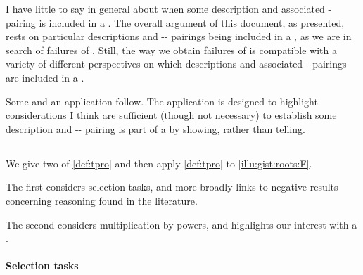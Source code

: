 \begin{note}
  I have little to say in general about when some description and associated - pairing is included in a \tpro{}.
  The overall argument of this document, as presented, rests on particular descriptions and -- pairings being included in a \tpro{}, as we are in search of failures of \issueInclusion{}.
  Still, the way we obtain failures of \issueInclusion{} is compatible with a variety of different perspectives on which descriptions and associated - pairings are included in a \tpro{}.

  Some  and an application follow.
  The application is designed to highlight considerations I think are sufficient (though not necessary) to establish some description and -- pairing is part of a \tpro{} by showing, rather than telling.
\end{note}



\subsection{}
\label{sec:illu3-1}

\begin{note}
  We give two  of \autoref{def:tpro} and then apply \autoref{def:tpro} to \autoref{illu:gist:roots:F}.

  The first  considers selection tasks, and more broadly links  to negative results concerning reasoning found in the literature.

  The second  considers multiplication by powers, and highlights our interest with a \tprof{}.
\end{note}



\paragraph*{Selection tasks}
\nocite{Wason:1968aa}
\nocite{Wason:1971aa}
\label{par:selection-tasks}


